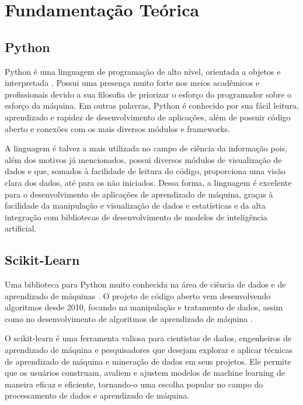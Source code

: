 \chapter{Fundamentação Teórica}
\label{fund_teo}

\section{Python}

Python é uma linguagem de programação de alto nível, orientada a objetos e interpretada \cite{van1995python}. Possui uma presença muito forte nos meios acadêmicos e profissionais devido a sua filosofia de priorizar o esforço do programador sobre o esforço da máquina. Em outras palavras, Python é conhecido por sua fácil leitura, aprendizado e rapidez de desenvolvimento de aplicações, além de possuir código aberto e conexões com os mais diversos módulos e frameworks.

A linguagem é talvez a mais utilizada no campo de ciência da informação pois, além dos motivos já mencionados, possui diversos módulos de visualização de dados e que, somados à facilidade de leitura do código, proporciona uma visão clara dos dados, até para os não iniciados. Dessa forma, a linguagem é excelente para o desenvolvimento de aplicações de aprendizado de máquina, graças à facilidade da manipulação e visualização de dados e estatísticas e da alta integração com bibliotecas de desenvolvimento de modelos de inteligência artificial.

\section{Scikit-Learn}

Uma biblioteca para Python muito conhecida na área de ciência de dados e de aprendizado de máquinas \cite{sklearn_api}. O projeto de código aberto vem desenvolvendo algoritmos desde 2010, focando na manipulação e tratamento de dados, assim como no desenvolvimento de algoritmos de aprendizado de máquina \cite{scikit-learn}.

O scikit-learn é uma ferramenta valiosa para cientistas de dados, engenheiros de aprendizado de máquina e pesquisadores que desejam explorar e aplicar técnicas de aprendizado de máquina e mineração de dados em seus projetos. Ele permite que os usuários construam, avaliem e ajustem modelos de machine learning de maneira eficaz e eficiente, tornando-o uma escolha popular no campo do processamento de dados e aprendizado de máquina.

